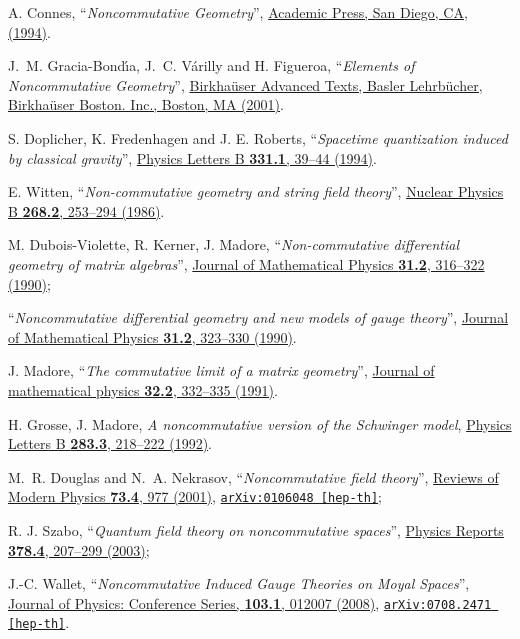 \documentclass[a4paper,11pt,twoside]{article}
\numberwithin{equation}{section}
\newcommand{\doi}[2]{\href{http://dx.doi.org/#1}{#2}}
\newcommand{\arxiv}[3]{\href{#3}{\texttt{arXiv:#1 [#2]}}}
\theoremstyle{nonumberplain}
\newcounter{and}
\begin{document}
\begin{thebibliography}{88} 

%
A. Connes, %
``\emph{Noncommutative Geometry}'', %
\href{http://www.alainconnes.org/en/downloads.php}{Academic Press, San Diego, CA, (1994)}. %

%
J.~M. Gracia-Bond{\'\i}a, J.~C. V{\'a}rilly and H. Figueroa, %
``\emph{Elements of Noncommutative Geometry}'', %
\doi{10.1007/978-1-4612-0005-5}{Birkha\"user Advanced Texts, Basler Lehrb\"ucher, Birkha\"user Boston. Inc., Boston, MA (2001)}.%

%
S. Doplicher, K. Fredenhagen and J. E. Roberts, %
``\emph{Spacetime quantization induced by classical gravity}'', %
\doi{10.1016/0370-2693(94)90940-7}{Physics Letters B \textbf{331.1}, 39--44 (1994)}.%

%
E. Witten, %
``\emph{Non-commutative geometry and string field theory}'', %
\doi{10.1016/0550-3213(86)90155-0}{Nuclear Physics B \textbf{268.2}, 253--294 (1986)}.%

M. Dubois-Violette, R. Kerner, J. Madore, %
``\emph{Non-commutative differential geometry of matrix algebras}'', %
\doi{10.1063/1.528916}{Journal of Mathematical Physics \textbf{31.2}, 316--322 (1990)};\par%
``\emph{Noncommutative differential geometry and new models of gauge theory}'', %
\doi{10.1063/1.528917}{Journal of Mathematical Physics \textbf{31.2}, 323--330 (1990)}.%

J. Madore, %
``\emph{The commutative limit of a matrix geometry}'', %
\doi{10.1063/1.529418}{Journal of mathematical physics \textbf{32.2}, 332--335 (1991)}.\par%
H. Grosse, J. Madore, %
\emph{A noncommutative version of the Schwinger model}, %
\doi{10.1016/0370-2693(92)90011-R}{Physics Letters B \textbf{283.3}, 218--222 (1992)}.%

%
M.~R. Douglas and N.~A. Nekrasov, %
``\emph{Noncommutative field theory}'', %
\doi{10.1103/RevModPhys.73.977}{Reviews of Modern Physics \textbf{73.4}, 977 (2001)}, %
\arxiv{0106048}{hep-th}{http://arxiv.org/abs/hep-th/0106048};\par%
R. J. Szabo, %
``\emph{Quantum field theory on noncommutative spaces}'', %
\doi{10.1016/S0370-1573(03)00059-0}{Physics Reports \textbf{378.4}, 207--299 (2003)};\par%
J.-C. Wallet, %
``\emph{Noncommutative Induced Gauge Theories on Moyal Spaces}'', %
\doi{10.1088/1742-6596/103/1/012007}{Journal of Physics: Conference Series, \textbf{103.1}, 012007 (2008)}, %
\arxiv{0708.2471}{hep-th}{http://arxiv.org/abs/arXiv:0708.2471}.%


\end{thebibliography}
\end{document}
